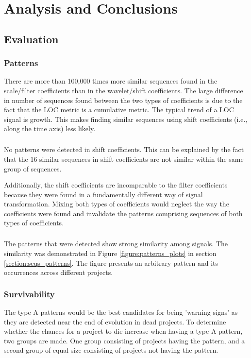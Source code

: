 \chapter{Analysis and Conclusions}
\label{analysis}

\section{Evaluation}
\subsection{Patterns}
\label{section:pattern_evaluation}
There are more than 100,000 times more similar sequences found in the
scale/filter coefficients than in the wavelet/shift coefficients. The large
difference in number of sequences found between the two types of coefficients
is due to the fact that the LOC metric is a cumulative metric. The typical
trend of a LOC signal is growth. This makes finding similar sequences using
shift coefficients (i.e., along the time axis) less likely.

\paragraph{}
No patterns were detected in shift coefficients. This can be explained by the
fact that the 16 similar sequences in shift coefficients are not similar within
the same group of sequences.

Additionally, the shift coefficients are incomparable to the filter coefficients
because they were found in a fundamentally different way of signal
transformation. Mixing both types of coefficients would neglect the way the
coefficients were found and invalidate the patterns comprising sequences of
both types of coefficients.

\paragraph{}
The patterns that were detected show strong similarity among signals. The
similarity was demonstrated in Figure \ref{figure:patterns_plots} in section
\ref{section:seqs_patterns}. The figure presents an arbitrary pattern and its
occurrences across different projects.

\subsection{Survivability}
\label{section:kp_survival}
The type A patterns would be the best candidates for being 'warning signs' as
they are detected near the end of evolution in dead projects. To determine
whether the chances for a project to die increase when having a type A pattern,
two groups are made. One group consisting of projects having the pattern, and
a second group of equal size consisting of projects not having the pattern.

